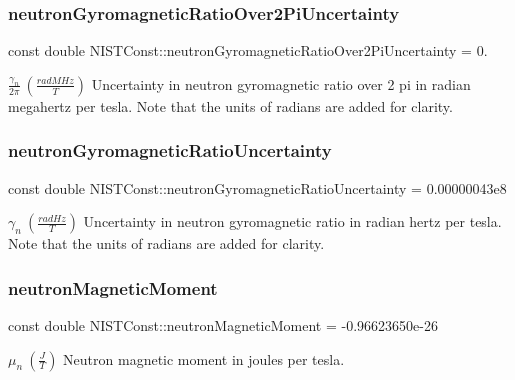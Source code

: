 \subsubsection{\texorpdfstring{neutron\+Gyromagnetic\+Ratio\+Over2\+Pi\+Uncertainty}{neutronGyromagneticRatioOver2PiUncertainty}}
{\footnotesize\ttfamily const double N\+I\+S\+T\+Const\+::neutron\+Gyromagnetic\+Ratio\+Over2\+Pi\+Uncertainty = 0.}

$\frac{\gamma_n}{2\pi} \ (\frac{rad MHz}{T})$ Uncertainty in neutron gyromagnetic ratio over 2 pi in radian megahertz per tesla. Note that the units of radians are added for clarity. \mbox{\label{group___neutron_ga4f48bb36482cdd64b95e17e52939df96}} 
\subsubsection{\texorpdfstring{neutron\+Gyromagnetic\+Ratio\+Uncertainty}{neutronGyromagneticRatioUncertainty}}
{\footnotesize\ttfamily const double N\+I\+S\+T\+Const\+::neutron\+Gyromagnetic\+Ratio\+Uncertainty = 0.\+00000043e8}

$\gamma_n \ (\frac{rad Hz}{T})$ Uncertainty in neutron gyromagnetic ratio in radian hertz per tesla. Note that the units of radians are added for clarity. \mbox{\label{group___neutron_ga42a101bcaf7105edbfd6c06de9633d22}} 
\subsubsection{\texorpdfstring{neutron\+Magnetic\+Moment}{neutronMagneticMoment}}
{\footnotesize\ttfamily const double N\+I\+S\+T\+Const\+::neutron\+Magnetic\+Moment = -\/0.\+96623650e-\/26}

$\mu_n \ (\frac{J}{T})$ Neutron magnetic moment in joules per tesla. \mbox{\label{group___neutron_ga01b6142f2d5dd4cd6ff10d2938a312cf}} 
